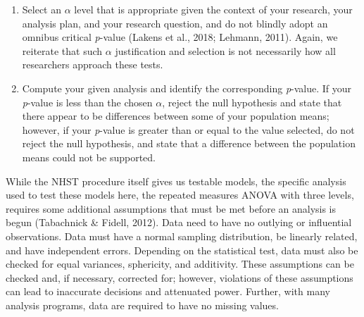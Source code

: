 \documentclass[,man, mask]{apa6}
\theoremstyle{definition}
\theoremstyle{definition}
\theoremstyle{definition}
\theoremstyle{remark}
\begin{document}
\begin{enumerate}
\def\labelenumi{\arabic{enumi})}
\setcounter{enumi}{1}
\item
  Select an \(\alpha\) level that is appropriate given the context of
  your research, your analysis plan, and your research question, and do
  not blindly adopt an omnibus critical \emph{p}-value (Lakens et al.,
  2018; Lehmann, 2011). Again, we reiterate that such \(\alpha\)
  justification and selection is not necessarily how all researchers
  approach these tests.
\item
  Compute your given analysis and identify the corresponding
  \emph{p}-value. If your \emph{p}-value is less than the chosen
  \(\alpha\), reject the null hypothesis and state that there appear to
  be differences between some of your population means; however, if your
  \emph{p}-value is greater than or equal to the value selected, do not
  reject the null hypothesis, and state that a difference between the
  population means could not be supported.
\end{enumerate}

While the NHST procedure itself gives us testable models, the specific
analysis used to test these models here, the repeated measures ANOVA
with three levels, requires some additional assumptions that must be met
before an analysis is begun (Tabachnick \& Fidell, 2012). Data need to
have no outlying or influential observations. Data must have a normal
sampling distribution, be linearly related, and have independent errors.
Depending on the statistical test, data must also be checked for equal
variances, sphericity, and additivity. These assumptions can be checked
and, if necessary, corrected for; however, violations of these
assumptions can lead to inaccurate decisions and attenuated power.
Further, with many analysis programs, data are required to have no
missing values.
\end{document}
